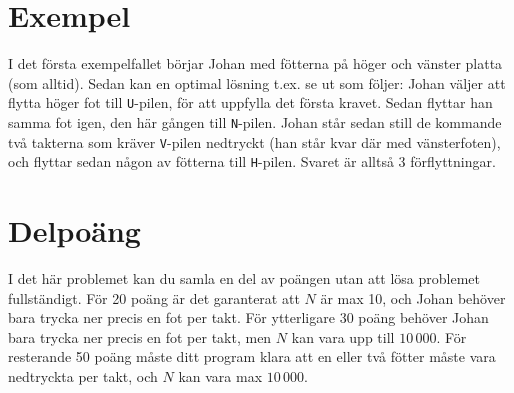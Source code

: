 \section*{Exempel}
I det första exempelfallet börjar Johan med fötterna på höger och vänster platta (som alltid). Sedan kan en optimal lösning t.ex. se ut som följer: Johan väljer att flytta höger fot till \texttt{U}-pilen, för att uppfylla det första kravet. Sedan flyttar han samma fot igen, den här gången till \texttt{N}-pilen. Johan står sedan still de kommande två takterna som kräver \texttt{V}-pilen nedtryckt (han står kvar där med vänsterfoten), och flyttar sedan någon av fötterna till \texttt{H}-pilen. Svaret är alltså 3 förflyttningar.

\section*{Delpoäng}
I det här problemet kan du samla en del av poängen utan att lösa problemet fullständigt. För 20 poäng är det garanterat att $N$ är max 10, och Johan behöver bara trycka ner precis en fot per takt. För ytterligare 30 poäng behöver Johan bara trycka ner precis en fot per takt, men $N$ kan vara upp till $10\,000$. För resterande 50 poäng måste ditt program klara att en eller två fötter måste vara nedtryckta per takt, och $N$ kan vara max $10\,000$.
